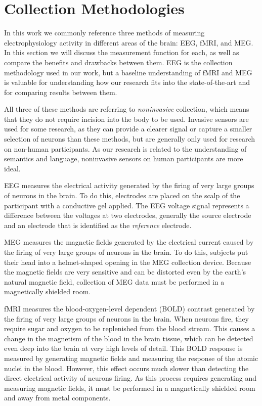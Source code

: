 \section{Collection Methodologies}

In this work we commonly reference three methods of measuring electrophysiology 
activity in different areas of the brain: EEG, fMRI, and MEG. In this section 
we will discuss the measurement function for each, as well as compare the 
benefits and drawbacks between them. EEG is the collection methodology used in 
our work, but a baseline understanding of fMRI and MEG is valuable for 
understanding how our research fits into the state-of-the-art and for comparing 
results between them. 

All three of these methods are referring to \emph{noninvasive} collection, 
which means that they do not require incision into the body to be used.  
Invasive sensors are used for some research, as they can provide a clearer 
signal or capture a smaller selection of neurons than these methods, but are 
generally only used for research on non-human participants. As our research is 
related to the understanding of semantics and language, noninvasive sensors on 
human participants are more ideal.

EEG measures the electrical activity generated by the firing of very large 
groups of neurons in the brain. To do this, electrodes are placed on the scalp 
of the participant with a conductive gel applied. The EEG voltage signal 
represents a difference between the voltages at two electrodes, generally the 
source electrode and an electrode that is identified as the \emph{reference} 
electrode.

MEG measures the magnetic fields generated by the electrical current caused by 
the firing of very large groups of neurons in the brain. To do this, subjects 
put their head into a helmet-shaped opening in the MEG collection device. 
Because the magnetic fields are very sensitive and can be distorted even by the 
earth's natural magnetic field, collection of MEG data must be performed in a 
magnetically shielded room.

fMRI measures the blood-oxygen-level dependent (BOLD) contrast generated by the 
firing of very large groups of neurons in the brain. When neurons fire, they 
require sugar and oxygen to be replenished from the blood stream. This causes a 
change in the magnetism of the blood in the brain tissue, which can be detected 
even deep into the brain at very high levels of detail. This BOLD response is 
measured by generating magnetic fields and measuring the response of the atomic 
nuclei in the blood. However, this effect occurs much slower than detecting the 
direct electrical activity of neurons firing. As this process requires 
generating and measuring magnetic fields, it must be performed in a 
magnetically shielded room and away from metal components.

